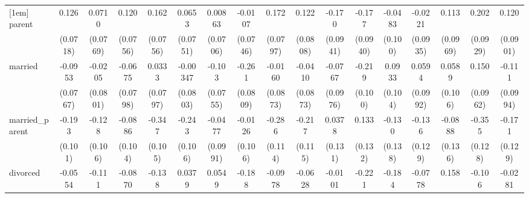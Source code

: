 {\begin{tabular}{l*{16}{c}}
[1em]
parent              &       0.126         &      0.0710         &       0.120         &       0.162\sym{*}  &      0.0653         &     0.00863         &     -0.0107         &       0.172\sym{*}  &       0.122         &      -0.170         &      -0.177         &     -0.0483         &     -0.0221         &       0.113         &       0.202\sym{*}  &       0.120         \\
                    &    (0.0718)         &    (0.0769)         &    (0.0756)         &    (0.0756)         &    (0.0751)         &    (0.0706)         &    (0.0746)         &    (0.0797)         &    (0.0808)         &    (0.0941)         &    (0.0940)         &     (0.100)         &    (0.0935)         &    (0.0969)         &    (0.0929)         &    (0.0901)         \\
[1em]
married             &     -0.0953         &     -0.0205         &     -0.0675         &      0.0333         &    -0.00347         &      -0.103         &      -0.261\sym{**} &     -0.0160         &     -0.0410         &     -0.0767         &      -0.219\sym{*}  &      0.0933         &      0.0594         &      0.0589         &       0.150         &      -0.111         \\
                    &    (0.0767)         &    (0.0801)         &    (0.0798)         &    (0.0797)         &    (0.0803)         &    (0.0755)         &    (0.0809)         &    (0.0873)         &    (0.0873)         &    (0.0976)         &     (0.100)         &     (0.104)         &    (0.0992)         &     (0.106)         &    (0.0962)         &    (0.0994)         \\
[1em]
married\_parent      &      -0.193         &      -0.128         &     -0.0886         &      -0.347\sym{***}&      -0.243\sym{*}  &     -0.0477         &     -0.0126         &      -0.286\sym{*}  &      -0.217         &      0.0378         &       0.133         &      -0.130         &      -0.136         &     -0.0888         &      -0.355\sym{**} &      -0.171         \\
                    &     (0.101)         &     (0.106)         &     (0.104)         &     (0.105)         &     (0.106)         &    (0.0991)         &     (0.106)         &     (0.114)         &     (0.115)         &     (0.131)         &     (0.132)         &     (0.138)         &     (0.129)         &     (0.136)         &     (0.128)         &     (0.129)         \\
[1em]
divorced            &     -0.0554         &      -0.111         &     -0.0870         &      -0.138         &      0.0379         &      0.0549         &      -0.188         &     -0.0978         &     -0.0628         &     -0.0101         &      -0.221         &      -0.184         &     -0.0778         &       0.158         &      -0.106         &     -0.0281         \\

\end{tabular}}
